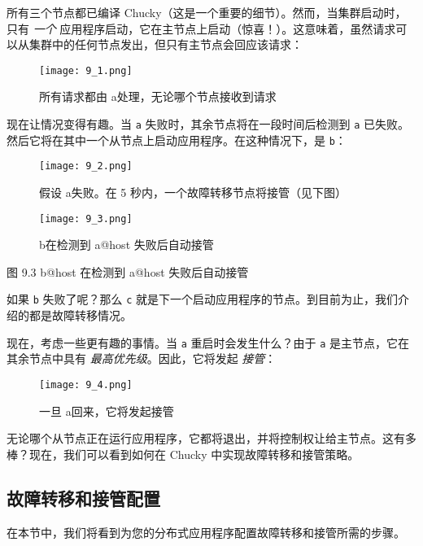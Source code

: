 所有三个节点都已编译
Chucky（这是一个重要的细节）。然而，当集群启动时，只有 \emph{一个}
应用程序启动，它在主节点上启动（惊喜！）。这意味着，虽然请求可以从集群中的任何节点发出，但只有主节点会回应该请求：


\begin{figure}[!ht]
    \centering
    \texttt{[image: 9\_1.png]}
    \caption{所有请求都由 a\@host 处理，无论哪个节点接收到请求}
    \label{fig:9_1}
\end{figure}


现在让情况变得有趣。当 \texttt{a}
失败时，其余节点将在一段时间后检测到 \texttt{a}
已失败。然后它将在其中一个从节点上启动应用程序。在这种情况下，是
\texttt{b}：

\begin{figure}[!ht]
    \centering
    \texttt{[image: 9\_2.png]}
    \caption{假设 a\@host 失败。在 5 秒内，一个故障转移节点将接管（见下图）}
    \label{fig:9_2}
\end{figure}

\begin{figure}[!ht]
    \centering
    \texttt{[image: 9\_3.png]}
    \caption{b\@host 在检测到 a@host 失败后自动接管}
    \label{fig:9_3}
\end{figure}


图 9.3 b@host 在检测到 a@host 失败后自动接管

如果 \texttt{b} 失败了呢？那么
\texttt{c}
就是下一个启动应用程序的节点。到目前为止，我们介绍的都是故障转移情况。

现在，考虑一些更有趣的事情。当 \texttt{a}
重启时会发生什么？由于 \texttt{a}
是主节点，它在其余节点中具有 \emph{最高优先级}。因此，它将发起
\emph{接管}：

\begin{figure}[!ht]
    \centering
    \texttt{[image: 9\_4.png]}
    \caption{一旦 a\@host 回来，它将发起接管}
    \label{fig:9_4}
\end{figure}


无论哪个从节点正在运行应用程序，它都将退出，并将控制权让给主节点。这有多棒？现在，我们可以看到如何在
Chucky 中实现故障转移和接管策略。


\subsection{故障转移和接管配置}

在本节中，我们将看到为您的分布式应用程序配置故障转移和接管所需的步骤。

